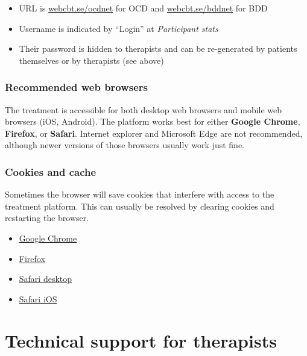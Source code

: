 \documentclass[]{book}
\providecommand{\tightlist}{%
  \setlength{\itemsep}{0pt}\setlength{\parskip}{0pt}}
\theoremstyle{definition}
\theoremstyle{definition}
\theoremstyle{definition}
\theoremstyle{remark}
\begin{document}
\begin{itemize}
\tightlist
\item
  URL is \url{webcbt.se/ocdnet} for OCD and \url{webcbt.se/bddnet} for
  BDD
\item
  Username is indicated by ``Login'' at \emph{Participant stats}
\item
  Their password is hidden to therapists and can be re-generated by
  patients themselves or by therapists (see above)
\end{itemize}

\hypertarget{recommended-web-browsers}{%
\subsubsection{Recommended web
browsers}\label{recommended-web-browsers}}

The treatment is accessible for both desktop web browsers and mobile web
browsers (iOS, Android). The platform works best for either
\textbf{Google Chrome}, \textbf{Firefox}, or \textbf{Safari}. Internet
explorer and Microsoft Edge are not recommended, although newer versions
of those browsers usually work just fine.

\hypertarget{cookies-and-cache}{%
\subsubsection{Cookies and cache}\label{cookies-and-cache}}

Sometimes the browser will save cookies that interfere with access to
the treatment platform. This can usually be resolved by clearing cookies
and restarting the browser.

\begin{itemize}
\tightlist
\item
  \href{https://support.google.com/chrome/answer/95647?co=GENIE.Platform\%3DDesktop\&hl=en}{Google
  Chrome}
\item
  \href{https://support.mozilla.org/en-US/kb/delete-cookies-remove-info-websites-stored}{Firefox}
\item
  \href{https://support.apple.com/kb/ph21411?locale=en_US}{Safari
  desktop}
\item
  \href{https://support.apple.com/en-gb/HT201265}{Safari iOS}
\end{itemize}

\hypertarget{technical-support-for-therapists}{%
\section{Technical support for
therapists}\label{technical-support-for-therapists}}
\end{document}
